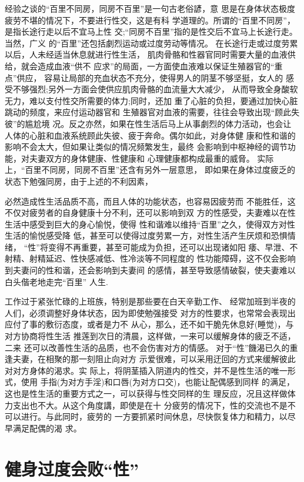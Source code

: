 \documentclass[12pt,UTF8]{ctexbook}
\begin{document}
经验之谈的“百里不同房，同房不百里”是一句古老俗諺，意
思是在身体状态极度疲劳不堪的情况下，不要进行性交，这是有科
学道理的。所谓的“百里不同房”，是指长途行走以后不宜马上性
交;“同房不百里”指的是性交后不宜马上长途行走。当然，广义
的“百里”还包括劇烈运动或过度劳动等情况。
在长途行走或过度劳累以后，人未经适当休息就进行性生活，
肌肉骨骼和性器官同时需要大量的血液供给，就会造成血液“供不
应求”的局面，一方面使血液难以保证生殖器官的“重点”供应，
容易让局部的充血状态不充分，使得男人的阴茎不够坚挺，女人的
感受不够强烈;另外一方面会使供应肌肉骨骼的血流量大大减少，
从而导致全身酸软无力，难以支付性交所需要的体力;同时，还加
重了心脏的负担，要通过加快心脏跳动的频度，来应付运动器官和
生殖器官对血液的需要，往往会导致出现“顾此失彼”的尴尬境
况。反之亦然，如果在性生活后马上从事劇烈的体力活动，也会让
人体的心脏和血液系统顾此失彼、疲于奔命。偶尔如此，对身体健
康和性和谐的影响不会太大，但如果让类似的情况频繁发生，最终
会影响到中枢神经的调节功能，对夫妻双方的身体健康、性健康和
心理健康都构成最重的威脅。
实际上，“百里不同房，同房不百里”还含有另外一层意思，
即如果在身体过度疲乏的状态下勉强同房，由于上述的不利因素，

必然造成性生活品质不高，而且人体的功能状态，也容易因疲劳而
不能胜任，这不仅对疲劳者的自身健康十分不利，还可以影响到双
方的性感受，夫妻难以在性生活中感受到巨大的身心愉悦，使得
性和谐难以维持“百里”之久，使得双方对性生活的愉悦感受降
低，甚至可以使得过度劳累一方，对性生活产生厌烦和恐惧情绪，
“性”将变得不再重要，甚至可能成为负担，还可以出现诸如阳
痿、早泄、不射精、射精延迟、性快感减低、性冷淡等不同程度的
性功能障碍，这不仅会影响到夫妻问的性和谐，还会影响到夫妻间
的感情，甚至导致感情破裂，使夫妻难以白头偕老地走完“百里”
人生.

工作过于紧张忙碌的上班族，特别是那些要在白天辛勤工作、
经常加班到半夜的人们，必须调整好身体状态，因为即使勉强接受
对方的性要求，也常常会表现出应付了事的敷衍态度，或者是力不
从心，那么，还不如干脆先休息好(睡觉)，与对方协商将性生活
推莲到次日的清晨，这样做，一来可以缓解身体的疲乏不适，二来
还可以改善性生活的品质，也不会伤害对方的情感。
对于“性”饑渴已久的重逢夫妻，在相聚的那一刻阻止向对方
示爱很难，可以采用迂回的方式来缓解彼此对对方身体的渴求。实
际上，将阴茎插入阴道内的性交，并不是性生活的唯一形式，使用
手指(为对方手淫)和口唇(为对方口交)，也能让配偶感到同样
的满足，这也是性生活的重要方式之一，可以获得与性交同样的生
理反应，况且这样做体力支出也不大。从这个角度講，即使是在十
分疲劳的情况下，性的交流也不是不可以进行。与此同时，疲劳的
一方要抓紧时间休息，尽快恢复体力和精力，以尽早满足配偶的渴
求。

\section{健身过度会败“性”}
\end{document}

